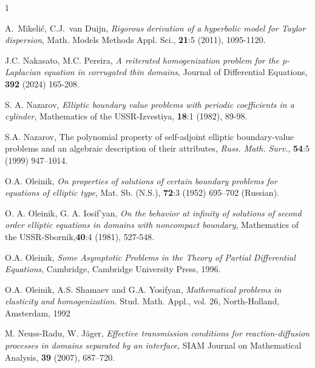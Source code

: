 \documentclass[reqno]{amsart}            %
\numberwithin{equation}{section}
\begin{document}
\begin{thebibliography}{1}
		
		
		
		A.~Mikeli\'{c}, C.J.~van Duijn,
		\textit{Rigorous derivation of a hyperbolic model for {T}aylor
			dispersion},
		{Math. Models Methods Appl. Sci.}, \textbf{21}:5 (2011), 1095-1120.
		
		
		J.C. Nakasato,  M.C. Pereira,  \textit{A reiterated homogenization problem for the p-Laplacian equation in corrugated thin domains}, Journal of Differential Equations, \textbf{392} (2024) 165-208.
		
		
		
		S. A. Nazarov, \textit{Elliptic boundary value problems with periodic coefficients in a cylinder},
		Mathematics of the USSR-Izvestiya, \textbf{18}:1 (1982), 89-98.
		
		S.A. Nazarov, The polynomial property of self-adjoint elliptic boundary-value problems and an algebraic description of their attributes,
		\textit{Russ. Math. Surv.}, \textbf{54}:5 (1999) 947--1014.
		
		O.A. Oleinik, \textit{On properties of solutions of certain boundary
			problems for equations of elliptic type}, Mat. Sb. (N.S.), \textbf{72}:3 (1952) 695–702 (Russian).
		
		
		O. A. Oleinik, G. A. Iosif’yan, \textit{On the behavior at infinity
			of solutions of second order elliptic equations in domains with
			noncompact boundary}, Mathematics of the USSR-Sbornik,\textbf{40}:4 (1981), 527-548.
		
		
		O.A. Oleinik, \textit{Some Asymptotic Problems in the Theory of Partial Differential Equations},
		Cambridge, Cambridge University Press, 1996.
		
		
		{O.A. Oleinik, A.S.  Shamaev and G.A.  Yosifyan}, \emph{Mathematical problems in
			elasticity and homogenization.} Stud. Math. Appl., vol. 26, North-Holland, Amsterdam, 1992
		
		{M. Neuss-Radu, W. J\"{a}ger,}
		\textit{Effective transmission conditions for reaction-diffusion processes in domains separated by an interface},
		{SIAM Journal on Mathematical Analysis},
		\textbf{39} (2007), 687--720.
		

\end{thebibliography}
\end{document}
